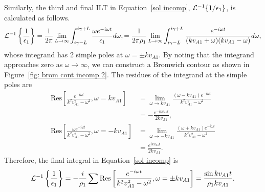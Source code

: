 \documentclass{aastex61}
\begin{document}
Similarly, the third and final ILT in Equation~\eqref{sol incomp}, $\mathcal{L}^{-1}\{ 1 / \epsilon_1 \}$, is calculated as follows.
\begin{equation}
\mathcal{L}^{-1}\left\{ \frac{1}{\e_1} \right\} = \frac{1}{2\pi}\lim_{L \to \infty} \int_{i\gamma - L}^{i\gamma + L} \frac{\omega e^{-i\omega t}}{\e_1} d\omega,
= \frac{1}{2\pi\rho_1}\lim_{L \to \infty} \int_{i\gamma - L}^{i\gamma + L} \frac{e^{-i\omega t}}{(kv_{A1} + \omega)(kv_{A1} - \omega)} d\omega,
\end{equation}
whose integrand has 2 simple poles at $\omega = \pm k v_{A1}$. By noting that the integrand approaches zero as $\omega \to \infty$, we can construct a Bromwich contour as shown in Figure~\ref{fig: brom cont incomp 2}. The residues of the integrand at the simple poles are
\begin{align}
\mathrm{Res}\left[\frac{e^{-i\omega t}}{k^2v_{A1}^2 - \omega^2}, \omega = kv_{A1} \right] &= 
\lim_{\omega \to kv_{A1}} \frac{(\omega - kv_{A1}) e^{-i\omega t}}{k^2v_{A1}^2 - \omega^2} \\ 
&= -\frac{e^{-ikv_{A1} t}}{2kv_{A1}}, \\
\mathrm{Res}\left[\frac{\omega e^{-i\omega t}}{k^2v_{A1}^2 - \omega^2}, \omega = -kv_{A1} \right] &= 
\lim_{\omega \to -kv_{A1}} \frac{(\omega + kv_{A1}) e^{-i\omega t}}{k^2v_{A1}^2 - \omega^2} \\ 
&= \frac{e^{ikv_{A1} t}}{2kv_{A1}}.
\end{align}
Therefore, the final integral in Equation~\eqref{sol incomp} is
\begin{equation}
\mathcal{L}^{-1}\left\{ \frac{1}{\e_1} \right\} = -\frac{i}{\rho_1} \sum \mathrm{Res} \left[ \frac{e^{-i\omega t}}{k^2v_{A1}^2 - \omega^2}, \omega = \pm kv_{A1} \right] = \frac{\sin{kv_{A1}t}}{\rho_1kv_{A1}}.
\end{equation}
\end{document}
